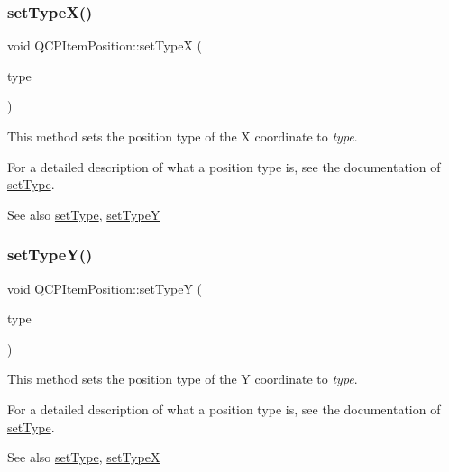 \subsubsection{\texorpdfstring{set\+Type\+X()}{setTypeX()}}
{\footnotesize\ttfamily void Q\+C\+P\+Item\+Position\+::set\+TypeX (\begin{DoxyParamCaption}\item[{\hyperlink{class_q_c_p_item_position_aad9936c22bf43e3d358552f6e86dbdc8}{Q\+C\+P\+Item\+Position\+::\+Position\+Type}}]{type }\end{DoxyParamCaption})}

This method sets the position type of the X coordinate to {\itshape type}.

For a detailed description of what a position type is, see the documentation of \hyperlink{class_q_c_p_item_position_aa476abf71ed8fa4c537457ebb1a754ad}{set\+Type}.

\begin{DoxySeeAlso}{See also}
\hyperlink{class_q_c_p_item_position_aa476abf71ed8fa4c537457ebb1a754ad}{set\+Type}, \hyperlink{class_q_c_p_item_position_ac2a454aa5a54c1615c50686601ec4510}{set\+TypeY} 
\end{DoxySeeAlso}
\mbox{\label{class_q_c_p_item_position_ac2a454aa5a54c1615c50686601ec4510}} 
\subsubsection{\texorpdfstring{set\+Type\+Y()}{setTypeY()}}
{\footnotesize\ttfamily void Q\+C\+P\+Item\+Position\+::set\+TypeY (\begin{DoxyParamCaption}\item[{\hyperlink{class_q_c_p_item_position_aad9936c22bf43e3d358552f6e86dbdc8}{Q\+C\+P\+Item\+Position\+::\+Position\+Type}}]{type }\end{DoxyParamCaption})}

This method sets the position type of the Y coordinate to {\itshape type}.

For a detailed description of what a position type is, see the documentation of \hyperlink{class_q_c_p_item_position_aa476abf71ed8fa4c537457ebb1a754ad}{set\+Type}.

\begin{DoxySeeAlso}{See also}
\hyperlink{class_q_c_p_item_position_aa476abf71ed8fa4c537457ebb1a754ad}{set\+Type}, \hyperlink{class_q_c_p_item_position_a2113b2351d6d00457fb3559a4e20c3ea}{set\+TypeX} 
\end{DoxySeeAlso}
\mbox{\label{class_q_c_p_item_position_a008ff9ebe645a963671b68bcf7f7a1c0}} 

